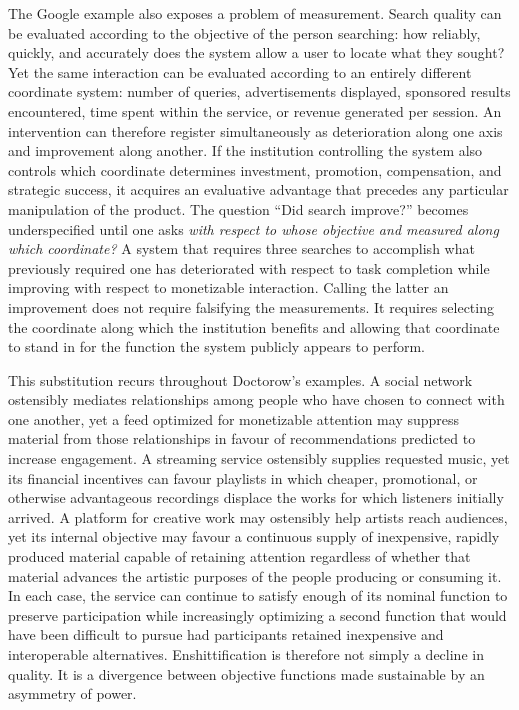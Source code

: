 \documentclass[11pt]{article}
\begin{document}
The Google example also exposes a problem of measurement. Search quality can be evaluated according to the objective of the person searching: how reliably, quickly, and accurately does the system allow a user to locate what they sought? Yet the same interaction can be evaluated according to an entirely different coordinate system: number of queries, advertisements displayed, sponsored results encountered, time spent within the service, or revenue generated per session. An intervention can therefore register simultaneously as deterioration along one axis and improvement along another. If the institution controlling the system also controls which coordinate determines investment, promotion, compensation, and strategic success, it acquires an evaluative advantage that precedes any particular manipulation of the product. The question ``Did search improve?'' becomes underspecified until one asks \emph{with respect to whose objective and measured along which coordinate?} A system that requires three searches to accomplish what previously required one has deteriorated with respect to task completion while improving with respect to monetizable interaction. Calling the latter an improvement does not require falsifying the measurements. It requires selecting the coordinate along which the institution benefits and allowing that coordinate to stand in for the function the system publicly appears to perform.

This substitution recurs throughout Doctorow's examples. A social network ostensibly mediates relationships among people who have chosen to connect with one another, yet a feed optimized for monetizable attention may suppress material from those relationships in favour of recommendations predicted to increase engagement. A streaming service ostensibly supplies requested music, yet its financial incentives can favour playlists in which cheaper, promotional, or otherwise advantageous recordings displace the works for which listeners initially arrived. A platform for creative work may ostensibly help artists reach audiences, yet its internal objective may favour a continuous supply of inexpensive, rapidly produced material capable of retaining attention regardless of whether that material advances the artistic purposes of the people producing or consuming it. In each case, the service can continue to satisfy enough of its nominal function to preserve participation while increasingly optimizing a second function that would have been difficult to pursue had participants retained inexpensive and interoperable alternatives. Enshittification is therefore not simply a decline in quality. It is a divergence between objective functions made sustainable by an asymmetry of power.
\end{document}
